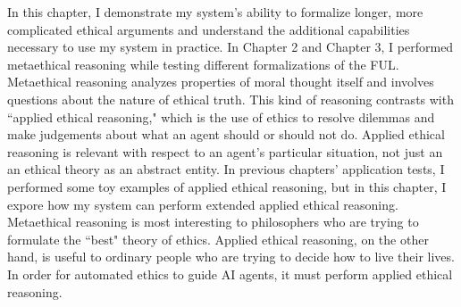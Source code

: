 %
\begin{isabellebody}%
%
%
\isadelimtheory
%
\endisadelimtheory
%
\isatagtheory
%
\endisatagtheory
{\isafoldtheory}%
%
\isadelimtheory
%
\endisadelimtheory
%
\isadelimdocument
%
\endisadelimdocument
%
\isatagdocument
%
\isamarkuptrue%
%
\endisatagdocument
{\isafolddocument}%
%
\isadelimdocument
%
\endisadelimdocument
%
\begin{isamarkuptext}%
In this chapter, I 
demonstrate my system's ability to formalize longer, more complicated ethical arguments and understand 
the additional capabilities necessary to use my system in practice. In Chapter 2
and Chapter 3, I performed metaethical reasoning while testing different formalizations of the FUL. Metaethical
reasoning analyzes properties of moral thought itself and involves questions about the nature of ethical
truth. This kind of reasoning contrasts with ``applied 
ethical reasoning," which is the use of ethics to resolve dilemmas and make judgements about 
what an agent should or should not do. Applied ethical reasoning is relevant with respect to an agent's
particular situation, not just an an ethical theory as an abstract entity. In previous chapters' application tests,
I performed some toy examples of applied ethical reasoning, but in this chapter, I expore how my system can 
perform extended applied ethical reasoning. Metaethical reasoning is most interesting to philosophers 
who are trying to formulate the ``best" theory of ethics. Applied ethical reasoning, on the other hand, 
is useful to ordinary people who are trying to decide how to live their lives. In order for automated 
ethics to guide AI agents, it must perform applied ethical reasoning. 


\end{isamarkuptext}
\end{isabellebody}
